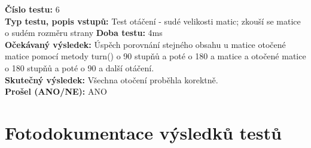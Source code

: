 \documentclass[a4paper,12pt]{article}
\begin{document}
     \textbf{Číslo testu:} 6\\
     \textbf{Typ testu, popis vstupů:} Test otáčení - sudé velikosti matic; zkouší se matice o sudém rozměru strany
     \textbf{Doba testu:} 4ms \\
     \textbf{Očekávaný výsledek:} Úspěch porovnání stejného obsahu u matice otočené matice pomocí metody turn()
     o 90 stupňů a poté o 180 a matice a otočené matice o 180 stupňů a poté o 90 a další otáčení.\\
     \textbf{Skutečný výsledek:} Všechna otočení proběhla korektně.\\
     \textbf{Prošel (ANO/NE):} ANO\\
\section{Fotodokumentace výsledků testů}

\end{document}
